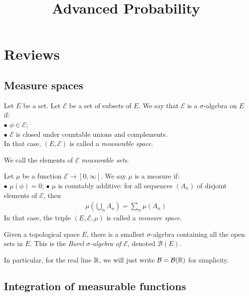 \documentclass[a4paper]{article}
\begin{document}
\title{Advanced Probability}

\maketitle

\newpage

\tableofcontents

\newpage

\section{Reviews}

\subsection{Measure spaces}

Let $E$ be a set. Let $\mathcal{E}$ be a set of subsets of $E$. We say that $\mathcal{E}$ is a $\sigma$-algebra on $E$ if:\\
$\bullet$ $\phi \in \mathcal{E}$;\\
$\bullet$ $\mathcal{E}$ is closed under countable unions and complements.\\
In that case, $(E,\mathcal{E})$ is called a \emph{measurable space}.

We call the elements of $\mathcal{E}$ \emph{measurable sets}.

Let $\mu$ be a function $\mathcal{E} \to [0,\infty]$. We say $\mu$ is a measure if:\\
$\bullet$ $\mu(\phi) = 0$;
$\bullet$ $\mu$ is countably additive: for all sequences $(A_n)$ of disjoint elements of $\mathcal{E}$, then
\begin{equation*}
\begin{aligned}
\mu(\bigcup_n A_n) = \sum_n \mu(A_n)
\end{aligned}
\end{equation*}
In that case, the triple $(E,\mathcal{E},\mu)$ is called a \emph{measure space}.

Given a topological space $E$, there is a smallest $\sigma$-algebra containing all the open sets in $E$. This is the \emph{Borel $\sigma$-algebra of $\mathcal{E}$}, denoted $\mathcal{B}(E)$.

In particular, for the real line $\mathbb{R}$, we will just write $\mathcal{B} = \mathcal{B}(\mathbb{R})$ for simplicity.

\subsection{Integration of measurable functions}
\end{document}
